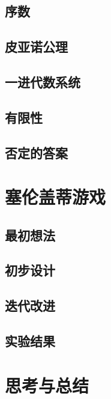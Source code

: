 \documentclass[a4paper,12pt]{article}
\begin{document}
\subsection{序数}

\subsection{皮亚诺公理}

\subsection{一进代数系统}

\subsection{有限性}

\subsection{否定的答案}

\section{塞伦盖蒂游戏}

\subsection{最初想法}

\subsection{初步设计}

\subsection{迭代改进}

\subsection{实验结果}

\section{思考与总结}
\end{document}
